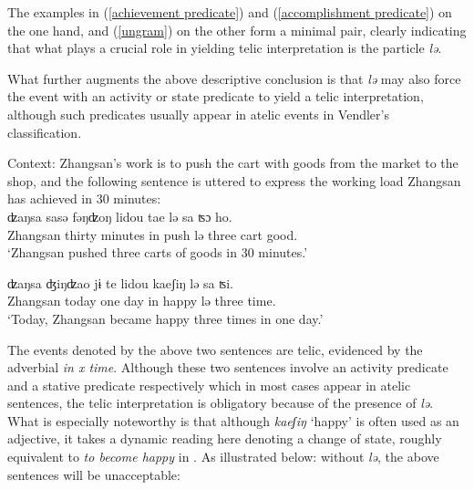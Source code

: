 \documentclass[output=paper]{langsci/langscibook}
\begin{document}
The examples in (\ref{achievement predicate}) and (\ref{accomplishment
predicate}) on the one hand, and (\ref{ungram}) on the other form a minimal
pair, clearly indicating that what plays a crucial role in yielding telic
interpretation is the particle \emph{lə}.

What further augments the above descriptive conclusion is that \emph{lə} may
also force the event with an activity or state predicate to yield a telic
interpretation, although such predicates usually appear in atelic events in
Vendler's classification.

\begin{exe}
\ex {} \begin{xlist}
    \ex\label{coerced telic}
    Context: Zhangsan's work is to push the cart with goods from the market to
    the shop, and the following sentence is uttered to express the working load
    Zhangsan has achieved in 30 minutes:\\
    \gll ʣaŋsa {sasə} {fəŋʣoŋ} lidou tae {lə} sa {ʦɔ} ho. \\
    Zhangsan thirty minutes in push {lə} three cart good. \\
    \glt \enquote*{Zhangsan pushed three carts of goods in 30 minutes.}

    \ex \gll ʣaŋsa ʤiŋʣao {jɨ} te lidou {kaeʃiŋ} {lə} sa {ʦi}. \\
    Zhangsan today one day in happy {lə} three time. \\
    \glt \enquote*{Today, Zhangsan became happy three times in one day.}
\end{xlist}
\end{exe}

The events denoted by the above two sentences are telic, evidenced by the
adverbial \emph{in x time}. Although these two sentences involve an activity
predicate and a stative predicate respectively which in most cases appear in
atelic sentences, the telic interpretation is obligatory because of the
presence of \emph{lə}. What is especially noteworthy is that although
\emph{kaeʃiŋ} `happy' is often used as an adjective, it takes a dynamic reading
here denoting a change of state, roughly equivalent to \textit{to become happy} in
. As illustrated below: without \emph{lə}, the above sentences
will be unacceptable:
\end{document}
